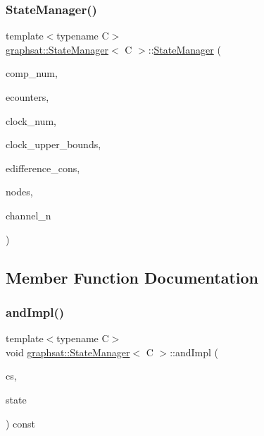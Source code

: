 \subsubsection{\texorpdfstring{StateManager()}{StateManager()}\hspace{0.1cm}{\footnotesize\ttfamily [2/2]}}
{\footnotesize\ttfamily template$<$typename C$>$ \\
\mbox{\hyperlink{classgraphsat_1_1_state_manager}{graphsat\+::\+State\+Manager}}$<$ C $>$\+::\mbox{\hyperlink{classgraphsat_1_1_state_manager}{State\+Manager}} (\begin{DoxyParamCaption}\item[{int}]{comp\+\_\+num,  }\item[{const vector$<$ \mbox{\hyperlink{classgraphsat_1_1_counter}{Counter}} $>$ \&}]{ecounters,  }\item[{int}]{clock\+\_\+num,  }\item[{const vector$<$ C $>$ \&}]{clock\+\_\+upper\+\_\+bounds,  }\item[{const vector$<$ \mbox{\hyperlink{classgraphsat_1_1_clock_constraint}{Clock\+Constraint}}$<$ C $>$$>$ \&}]{edifference\+\_\+cons,  }\item[{const vector$<$ int $>$ \&}]{nodes,  }\item[{int}]{channel\+\_\+n }\end{DoxyParamCaption})\hspace{0.3cm}{\ttfamily [inline]}}



\subsection{Member Function Documentation}
\mbox{\label{classgraphsat_1_1_state_manager_a2a4f0e95d8c6b0d3692b239bf4b64538}} 
\subsubsection{\texorpdfstring{andImpl()}{andImpl()}}
{\footnotesize\ttfamily template$<$typename C$>$ \\
void \mbox{\hyperlink{classgraphsat_1_1_state_manager}{graphsat\+::\+State\+Manager}}$<$ C $>$\+::and\+Impl (\begin{DoxyParamCaption}\item[{const \mbox{\hyperlink{classgraphsat_1_1_clock_constraint}{Clock\+Constraint}}$<$ C $>$ \&}]{cs,  }\item[{C $\ast$}]{state }\end{DoxyParamCaption}) const\hspace{0.3cm}{\ttfamily [inline]}}

